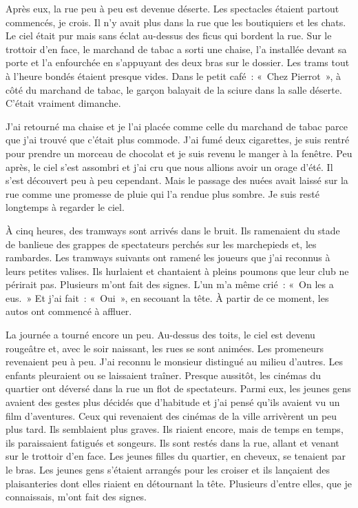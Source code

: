 \documentclass[french,twoside]{book} %
\begin{document}
Après eux, la rue peu à peu est devenue déserte. Les spectacles étaient partout commencés, je crois. Il n’y avait plus dans la rue que les boutiquiers et les chats. Le ciel était pur mais sans éclat au-dessus des ficus qui bordent la rue. Sur le trottoir d’en face, le marchand de tabac a sorti une chaise, l’a installée devant sa porte et l’a enfourchée en s’appuyant des deux bras sur le dossier. Les trams tout à l’heure bondés étaient presque vides. Dans le petit café : « Chez Pierrot », à côté du marchand de tabac, le garçon balayait de la sciure dans la salle déserte. C'était vraiment dimanche.\par
J'ai retourné ma chaise et je l’ai placée comme celle du marchand de tabac parce que j’ai trouvé que c’était plus commode. J'ai fumé deux cigarettes, je suis rentré pour prendre un morceau de chocolat et je suis revenu le manger à la fenêtre. Peu après, le ciel s’est assombri et j’ai cru que nous allions avoir un orage d’été. Il s’est découvert peu à peu cependant. Mais le passage des nuées avait laissé sur la rue comme une promesse de pluie qui l’a rendue plus sombre. Je suis resté longtemps à regarder le ciel.\par
À cinq heures, des tramways sont arrivés dans le bruit. Ils ramenaient du stade de banlieue des grappes de spectateurs perchés sur les marchepieds et, les rambardes. Les tramways suivants ont ramené les joueurs que j’ai reconnus à leurs petites valises. Ils hurlaient et chantaient à pleins poumons que leur club ne périrait pas. Plusieurs m’ont fait des signes. L'un m’a même crié : « On les a eus. » Et j’ai fait : « Oui », en secouant la tête. À partir de ce moment, les autos ont commencé à affluer.\par
La journée a tourné encore un peu. Au-dessus des toits, le ciel est devenu rougeâtre et, avec le soir naissant, les rues se sont animées. Les promeneurs revenaient peu à peu. J'ai reconnu le monsieur distingué au milieu d’autres. Les enfants pleuraient ou se laissaient traîner. Presque aussitôt, les cinémas du quartier ont déversé dans la rue un flot de spectateurs. Parmi eux, les jeunes gens avaient des gestes plus décidés que d’habitude et j’ai pensé qu’ils avaient vu un film d’aventures. Ceux qui revenaient des cinémas de la ville arrivèrent un peu plus tard. Ils semblaient plus graves. Ils riaient encore, mais de temps en temps, ils paraissaient fatigués et songeurs. Ils sont restés dans la rue, allant et venant sur le trottoir d’en face. Les jeunes filles du quartier, en cheveux, se tenaient par le bras. Les jeunes gens s’étaient arrangés pour les croiser et ils lançaient des plaisanteries dont elles riaient en détournant la tête. Plusieurs d’entre elles, que je connaissais, m’ont fait des signes.\par
\end{document}
